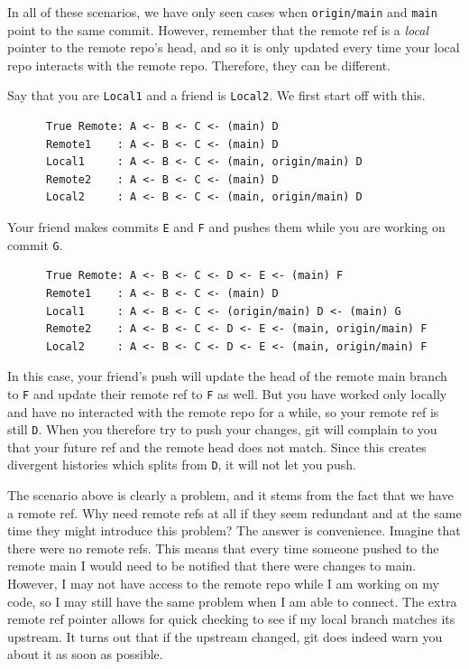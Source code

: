   In all of these scenarios, we have only seen cases when \texttt{origin/main} and \texttt{main} point to the same commit. However, remember that the remote ref is a \textit{local} pointer to the remote repo's head, and so it is only updated every time your local repo interacts with the remote repo. Therefore, they can be different. 

  \begin{example}
    Say that you are \texttt{Local1} and a friend is \texttt{Local2}. We first start off with this. 
    \begin{lstlisting}
      True Remote: A <- B <- C <- (main) D
      Remote1    : A <- B <- C <- (main) D 
      Local1     : A <- B <- C <- (main, origin/main) D 
      Remote2    : A <- B <- C <- (main) D
      Local2     : A <- B <- C <- (main, origin/main) D
    \end{lstlisting}
    Your friend makes commits \texttt{E} and \texttt{F} and pushes them while you are working on commit \texttt{G}.  
    \begin{lstlisting}
      True Remote: A <- B <- C <- D <- E <- (main) F
      Remote1    : A <- B <- C <- (main) D 
      Local1     : A <- B <- C <- (origin/main) D <- (main) G
      Remote2    : A <- B <- C <- D <- E <- (main, origin/main) F 
      Local2     : A <- B <- C <- D <- E <- (main, origin/main) F 
    \end{lstlisting} 
    In this case, your friend's push will update the head of the remote main branch to \texttt{F} and update their remote ref to \texttt{F} as well. But you have worked only locally and have no interacted with the remote repo for a while, so your remote ref is still \texttt{D}. When you therefore try to push your changes, git will complain to you that your future ref and the remote head does not match. Since this creates divergent histories which splits from \texttt{D}, it will not let you push. 
  \end{example}

  The scenario above is clearly a problem, and it stems from the fact that we have a remote ref. Why need remote refs at all if they seem redundant and at the same time they might introduce this problem? The answer is convenience. Imagine that there were no remote refs. This means that every time someone pushed to the remote main I would need to be notified that there were changes to main. However, I may not have access to the remote repo while I am working on my code, so I may still have the same problem when I am able to connect. The extra remote ref pointer allows for quick checking to see if my local branch matches its upstream. It turns out that if the upstream changed, git does indeed warn you about it as soon as possible. 

